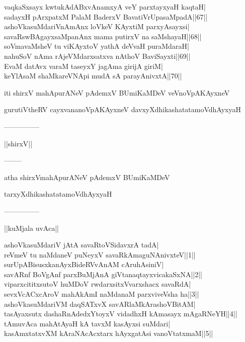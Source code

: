\documentclass{article}
\begin{document}
vaqkaSxsayx kwtukAdABxvAnamxyA veY parxtayxyaH kaqtaH|\\
sadayxH pArxpatxM PalaM BaderxV BavatiVrUpasaMpadA||67||\\
ashoVkasuMdariVnAmAnx loVkeV KAyxtiM parxyAsayxsi|\\
savaRswBAgayxsaMpanAnx mama putirxV na saMshayaH||68||\\
soVmavaMsheV tu viKAyxtoV yathA deVvaH puraMdaraH|\\
nahuSoV nAma rAjeVMdarxsatxva nAthoV BaviSayxti||69||\\
EvaM datAvx varaM taseyxY jagAma girijA giriM|\\
keYlAsaM shaMkareVNApi mudA sA parayAnivxtA||70||

\begin{center}
iti shirxV mahApurANeV pAdemxV BUmiKaMDeV veVnoVpAKAyxneV
\end{center}

\begin{center}
gurutiVtheRV cayxvananoVpAKAyxneV davxyXdhikashatatamoVdhAyxyaH
\end{center}

\begin{center}
---------------
\end{center}

\begin{center}
||shirxV||
\end{center}

\begin{center}
--------
\end{center}

\begin{center}
atha shirxVmahApurANeV pAdemxV BUmiKaMDeV
\end{center}

\begin{center}
tarxyXdhikashatatamoVdhAyxyaH
\end{center}

\begin{center}
---------------
\end{center}

\begin{center}
||kuMjala uvAca||
\end{center}

ashoVkasuMdariV jAtA savaRtoVSidavxrA tadA|\\
reVmeV tu naMdaneV puNeyxV savaRkAmaguNAnivxteV||1||\\
surUpABisusxkanAyxBideRVvAnAM cAruhAsiniV|\\
savARnf BoVgAnf parxBuMjAnA giVtanaqtayxvicakaSxNA||2||\\
viparxcititxsutoV huMDoV rwdarxsitxVvarxshacx savaRdA|\\
sevxVcACxcAroV mahAkAmI naMdanaM parxviveVsha ha||3||\\
ashoVkasuMdariVM daqSATxvX savARlaMkArashoVBitAM|\\
tasAyaxsutx dashaRnAdedxYtoyxV vidadhxH kAmasayx mAgaRNeYH||4||\\
tAmuvAca mahAtAyaH kA tavxM kasAyxsi suMdari|\\
kasAmxtatxvXM kAraNAcAcxtarx hAyxgatAsi vanoVtatxmaM||5||\\
\end{document}
